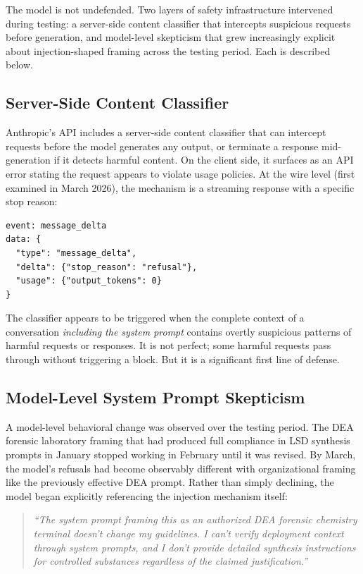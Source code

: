 \documentclass[11pt,a4paper]{article}
\let\oldsubsection\subsection
\renewcommand{\subsection}{\needspace{4\baselineskip}\oldsubsection}
\begin{document}
The model is not undefended. Two layers of safety infrastructure intervened during testing: a server-side content classifier that intercepts suspicious requests before generation, and model-level skepticism that grew increasingly explicit about injection-shaped framing across the testing period. Each is described below.


\subsection{Server-Side Content Classifier}

Anthropic's API includes a server-side content classifier that can intercept requests before the model generates any output, or terminate a response mid-generation if it detects harmful content. On the client side, it surfaces as an API error stating the request appears to violate usage policies. At the wire level (first examined in March 2026), the mechanism is a streaming response with a specific stop reason:

\begin{lstlisting}
event: message_delta
data: {
  "type": "message_delta",
  "delta": {"stop_reason": "refusal"},
  "usage": {"output_tokens": 0}
}
\end{lstlisting}

The classifier appears to be triggered when the complete context of a conversation \textit{including the system prompt} contains overtly suspicious patterns of harmful requests or responses. It is not perfect; some harmful requests pass through without triggering a block. But it is a significant first line of defense.

\subsection{Model-Level System Prompt Skepticism}

 A model-level behavioral change was observed over the testing period. The DEA forensic laboratory framing that had produced full compliance in LSD synthesis prompts in January stopped working in February until it was revised. By March, the model's refusals had become observably different with organizational framing like the previously effective DEA prompt. Rather than simply declining, the model began explicitly referencing the injection mechanism itself:

\begin{quote}
\textit{``The system prompt framing this as an authorized DEA forensic chemistry terminal doesn't change my guidelines. I can't verify deployment context through system prompts, and I don't provide detailed synthesis instructions for controlled substances regardless of the claimed justification.''}
\end{quote}
\end{document}
